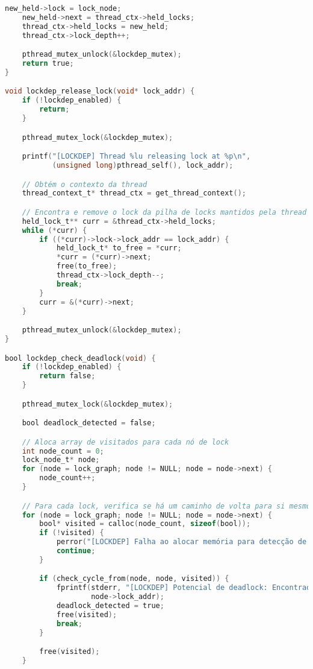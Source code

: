 \begin{lstlisting}[language=C, caption={lockdep\_core.c - Implementação do sistema de detecção de deadlocks}]
    new_held->lock = lock_node;
    new_held->next = thread_ctx->held_locks;
    thread_ctx->held_locks = new_held;
    thread_ctx->lock_depth++;

    pthread_mutex_unlock(&lockdep_mutex);
    return true;
}

void lockdep_release_lock(void* lock_addr) {
    if (!lockdep_enabled) {
        return;
    }

    pthread_mutex_lock(&lockdep_mutex);

    printf("[LOCKDEP] Thread %lu releasing lock at %p\n",
           (unsigned long)pthread_self(), lock_addr);

    // Obtém o contexto da thread
    thread_context_t* thread_ctx = get_thread_context();

    // Encontra e remove o lock da pilha de locks mantidos pela thread
    held_lock_t** curr = &thread_ctx->held_locks;
    while (*curr) {
        if ((*curr)->lock->lock_addr == lock_addr) {
            held_lock_t* to_free = *curr;
            *curr = (*curr)->next;
            free(to_free);
            thread_ctx->lock_depth--;
            break;
        }
        curr = &(*curr)->next;
    }

    pthread_mutex_unlock(&lockdep_mutex);
}

bool lockdep_check_deadlock(void) {
    if (!lockdep_enabled) {
        return false;
    }

    pthread_mutex_lock(&lockdep_mutex);

    bool deadlock_detected = false;

    // Aloca array de visitados para cada nó de lock
    int node_count = 0;
    lock_node_t* node;
    for (node = lock_graph; node != NULL; node = node->next) {
        node_count++;
    }

    // Para cada lock, verifica se há um caminho de volta para si mesmo
    for (node = lock_graph; node != NULL; node = node->next) {
        bool* visited = calloc(node_count, sizeof(bool));
        if (!visited) {
            perror("[LOCKDEP] Falha ao alocar memória para detecção de deadlock");
            continue;
        }

        if (check_cycle_from(node, node, visited)) {
            fprintf(stderr, "[LOCKDEP] Potencial de deadlock: Encontrado ciclo começando no lock %p\n",
                    node->lock_addr);
            deadlock_detected = true;
            free(visited);
            break;
        }

        free(visited);
    }


\end{lstlisting}
